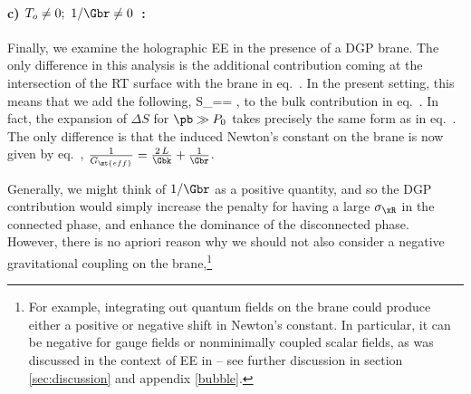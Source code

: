 
\begin{figure}[h]
	\def\svgwidth{0.9\linewidth}
\end{figure}

\paragraph{c) $T_o\ne 0;\ 1/\Gbr\ne 0$\ :} Finally, we examine the holographic EE in the presence of a DGP brane. The only difference in this analysis is the additional contribution coming at the intersection of the RT surface with the brane in eq.~.
In the present setting, this means that we add the following,
\beq\label{sample2}
S_==\,\pb\,,%
\eeq
to the bulk contribution in eq.~. In fact, the  expansion of $\Delta S$ for $\pb\gg P_0$ takes precisely the same form as in eq.~. The only difference is that the induced Newton's constant on the brane is now given by eq.~, \ie $\frac{1}{G_\mt{eff}}=\frac{2\,L}{\Gbk}+\frac{1}{\Gbr}$.

Generally, we might think of $1/\Gbr$ as a positive quantity, and so the DGP contribution  would simply increase the penalty for having a large $\sigma_\xR$ in the connected phase, and enhance the dominance of the disconnected phase. However, there is no apriori reason why we should not also consider a negative gravitational coupling on the brane,\footnote{For example, integrating out quantum fields on the brane could produce either a positive or negative shift in Newton's constant. In particular, it can be negative for gauge fields or nonminimally coupled scalar fields, as was discussed in the context of EE in \cite{Larsen:1995ax,Kabat:1995eq} -- see further discussion in section \ref{sec:discussion} and appendix \ref{bubble}.}%

